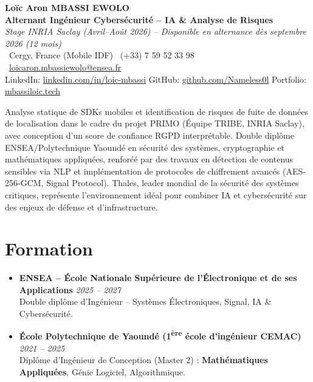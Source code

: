 \documentclass[a4paper,11pt]{article}
\begin{document}
\begin{center}
    {\Large \textbf{Lo\"ic Aron MBASSI EWOLO}} \\ \vspace{4pt}
    \textbf{\large Alternant Ing\'enieur Cybersécurité -- IA \& Analyse de Risques} \\
    \textit{\small Stage INRIA Saclay (Avril--Ao\^ut 2026) -- Disponible en alternance d\`es septembre 2026 (12 mois)} \\ \vspace{4pt}
    \small
    \Pointinghand\ Cergy, France (Mobile IDF) \quad \Mobilefone\ (+33) 7 59 52 33 98 \quad
    {\color{primary}\Letter\ \href{mailto:loicaron.mbassiewolo@ensea.fr}{loicaron.mbassiewolo@ensea.fr}} \\ \vspace{2pt}
    {\color{primary}LinkedIn: \href{https://www.linkedin.com/in/loic-mbassi/}{linkedin.com/in/loic-mbassi}} \quad
    {\color{primary}GitHub: \href{https://github.com/Nameless0l}{github.com/Nameless0l}} \quad
    {\color{primary}Portfolio: \href{https://mbassiloic.tech}{mbassiloic.tech}}
\end{center}
\vspace{-6pt}
\noindent\small{Analyse statique de SDKs mobiles et identification de risques de fuite de donn\'ees de localisation dans le cadre du projet PRIMO (\'Equipe TRIBE, INRIA Saclay), avec conception d'un score de confiance RGPD interprétable. Double dipl\^ome ENSEA/Polytechnique Yaound\'e en s\'ecurit\'e des syst\`emes, cryptographie et math\'ematiques appliqu\'ees, renfor\'c\'e par des travaux en d\'etection de contenus sensibles via NLP et impl\'ementation de protocoles de chiffrement avanc\'es (AES-256-GCM, Signal Protocol). Thales, leader mondial de la s\'ecurit\'e des syst\`emes critiques, repr\'esente l'environnement id\'eal pour combiner IA et cybersécurité sur des enjeux de d\'efense et d'infrastructure.}

\section{Formation}
\begin{itemize}[leftmargin=*, label=\tiny$\bullet$, nosep]
    \item \textbf{ENSEA -- \'Ecole Nationale Sup\'erieure de l'\'Electronique et de ses Applications} \hfill \textit{2025 -- 2027} \\
    \small{Double dipl\^ome d'Ing\'enieur -- Syst\`emes \'Electroniques, Signal, IA \& Cybersécurité.}
    \item \textbf{\'Ecole Polytechnique de Yaound\'e (1\textsuperscript{\`ere} \'ecole d'ing\'enieur CEMAC)} \hfill \textit{2021 -- 2025} \\
    \small{Dipl\^ome d'Ing\'enieur de Conception (Master 2) : \textbf{Math\'ematiques Appliqu\'ees}, G\'enie Logiciel, Algorithmique.}
\end{itemize}
\end{document}
